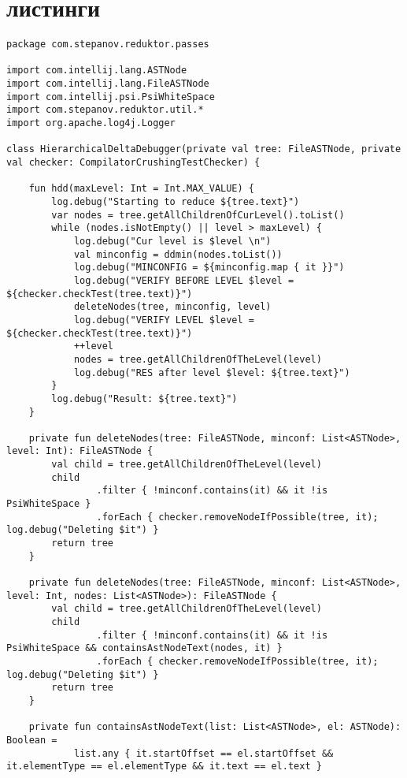 \chapter{листинги}
\begin{lstlisting}[caption = Исходный код файла HierarchialDeltaDebugger.kt]
package com.stepanov.reduktor.passes

import com.intellij.lang.ASTNode
import com.intellij.lang.FileASTNode
import com.intellij.psi.PsiWhiteSpace
import com.stepanov.reduktor.util.*
import org.apache.log4j.Logger

class HierarchicalDeltaDebugger(private val tree: FileASTNode, private val checker: CompilatorCrushingTestChecker) {

    fun hdd(maxLevel: Int = Int.MAX_VALUE) {
        log.debug("Starting to reduce ${tree.text}")
        var nodes = tree.getAllChildrenOfCurLevel().toList()
        while (nodes.isNotEmpty() || level > maxLevel) {
            log.debug("Cur level is $level \n")
            val minconfig = ddmin(nodes.toList())
            log.debug("MINCONFIG = ${minconfig.map { it }}")
            log.debug("VERIFY BEFORE LEVEL $level = ${checker.checkTest(tree.text)}")
            deleteNodes(tree, minconfig, level)
            log.debug("VERIFY LEVEL $level = ${checker.checkTest(tree.text)}")
            ++level
            nodes = tree.getAllChildrenOfTheLevel(level)
            log.debug("RES after level $level: ${tree.text}")
        }
        log.debug("Result: ${tree.text}")
    }

    private fun deleteNodes(tree: FileASTNode, minconf: List<ASTNode>, level: Int): FileASTNode {
        val child = tree.getAllChildrenOfTheLevel(level)
        child
                .filter { !minconf.contains(it) && it !is PsiWhiteSpace }
                .forEach { checker.removeNodeIfPossible(tree, it); log.debug("Deleting $it") }
        return tree
    }

    private fun deleteNodes(tree: FileASTNode, minconf: List<ASTNode>, level: Int, nodes: List<ASTNode>): FileASTNode {
        val child = tree.getAllChildrenOfTheLevel(level)
        child
                .filter { !minconf.contains(it) && it !is PsiWhiteSpace && containsAstNodeText(nodes, it) }
                .forEach { checker.removeNodeIfPossible(tree, it); log.debug("Deleting $it") }
        return tree
    }

    private fun containsAstNodeText(list: List<ASTNode>, el: ASTNode): Boolean =
            list.any { it.startOffset == el.startOffset && it.elementType == el.elementType && it.text == el.text }


\end{lstlisting}
